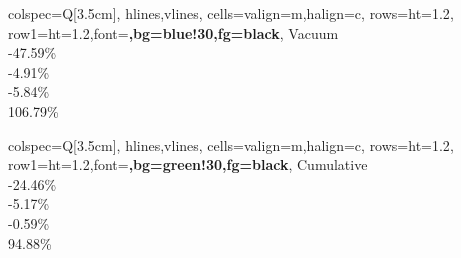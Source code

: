 \documentclass{article}
\begin{document}
\begin{center}
\begin{minipage}[t]{3.5cm}
\begin{tblr}{
				colspec={Q[3.5cm]},
				hlines,vlines,
				cells={valign=m,halign=c},
				rows={ht=1.2\baselineskip},
				row{1}={ht=1.2\baselineskip,font=\bfseries,bg=blue!30,fg=black},
			}
			Vacuum \\
			{-47.59\%} \\ %
			{-4.91\%} \\ %
			{-5.84\%} \\ %
			{106.79\%} \\ %
		\end{tblr}
	\end{minipage}
	\hspace{1em}
	\begin{minipage}[t]{3.5cm}
		\centering
		\begin{tblr}{
				colspec={Q[3.5cm]},
				hlines,vlines,
				cells={valign=m,halign=c},
				rows={ht=1.2\baselineskip},
				row{1}={ht=1.2\baselineskip,font=\bfseries,bg=green!30,fg=black},
			}
			Cumulative \\
			{-24.46\%} \\%
			{-5.17\%} \\%
			{-0.59\%} \\%
			{94.88\%} \\%
		\end{tblr}
	\end{minipage}	
\end{center}
\vspace{1em}
\end{document}
